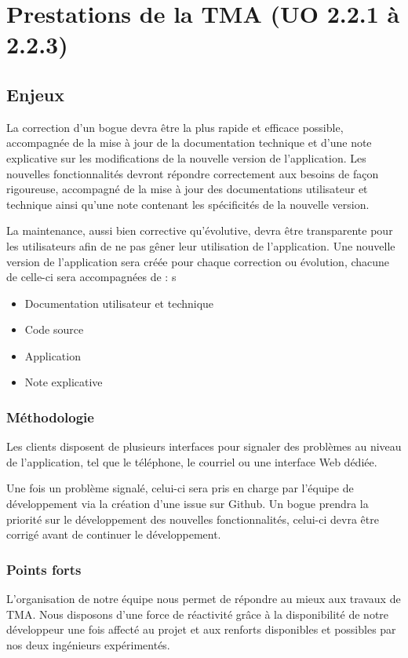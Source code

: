	\section{Prestations de la TMA (UO 2.2.1 à 2.2.3)}
	\subsection{Enjeux}
	La correction d’un bogue devra être la plus rapide et efficace possible, accompagnée de la mise à jour de la documentation technique et d’une note explicative sur les modifications de la nouvelle version de l’application. 
	Les nouvelles fonctionnalités devront répondre correctement aux besoins de façon rigoureuse, accompagné de la mise à jour des documentations utilisateur et technique ainsi qu’une note contenant les spécificités de la nouvelle version.

	La maintenance, aussi bien corrective qu’évolutive, devra être transparente pour les utilisateurs afin de ne pas gêner leur utilisation de l’application. Une nouvelle version de l’application sera créée pour chaque correction ou évolution, chacune de celle-ci sera accompagnées de : s
	
	\begin{itemize}
		\item Documentation utilisateur et technique
		\item Code source
		\item Application
		\item Note explicative
	\end{itemize}

	\subsubsection{Méthodologie}
	Les clients disposent de plusieurs interfaces pour signaler des problèmes au niveau de l’application, tel que le téléphone, le courriel ou une interface Web dédiée. 
	
	Une fois un problème signalé, celui-ci sera pris en charge par l’équipe de développement via la création d’une issue sur Github. Un bogue prendra la priorité sur le développement des nouvelles fonctionnalités, celui-ci devra être corrigé avant de continuer le développement. 
	
	\subsubsection{Points forts}
	L’organisation de notre équipe nous permet de répondre au mieux aux travaux de TMA. Nous disposons d’une force de réactivité grâce à la disponibilité de notre développeur une fois affecté au projet et aux renforts disponibles et possibles par nos deux ingénieurs expérimentés. 
	
